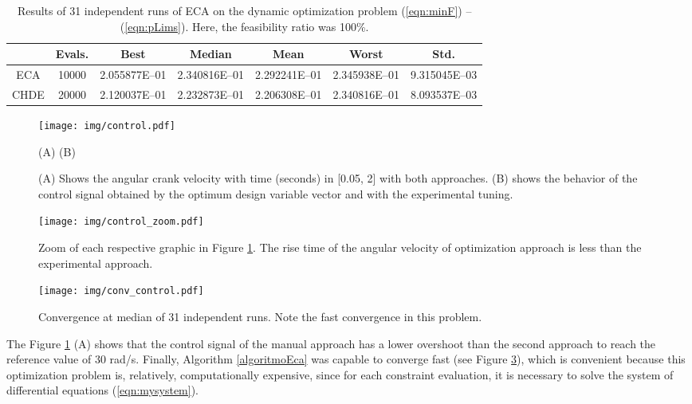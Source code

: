\documentclass[12pt,letterpape]{article}
\begin{document}
\begin{table}[!ht]
	\centering
	\begin{tabular}{ccccccc}
		\hline
		& {\bf Evals.} & {\bf Best} & {\bf Median} & {\bf Mean} & {\bf Worst} & {\bf Std.} \\ \hline
		ECA & 10000 & 2.055877E--01 & 2.340816E--01 & 2.292241E--01 & 2.345938E--01 & 9.315045E--03 \\ \hline
		CHDE & 20000 & 2.120037E--01 & 2.232873E--01 & 2.206308E--01 & 2.340816E--01 & 8.093537E--03 \\ \hline
	\end{tabular}
	\caption{Results of 31 independent runs of ECA on the dynamic optimization
	problem (\ref{eqn:minF}) -- (\ref{eqn:pLims}). Here, the feasibility ratio was 100\%.}
	\label{tab:res2}
\end{table}
% 
% 
% 
% 
\begin{figure}[!ht]
	\centering
	\texttt{[image: img/control.pdf]}
	\begin{center}
		(A) \hspace{0.4\linewidth} (B)
	\end{center}
	\caption{(A) Shows the angular crank velocity with time (seconds) in [0.05, 2]
	with both approaches. (B) shows the behavior of the control signal obtained
	by the optimum design variable vector and with the experimental tuning.}
	\label{fig:tunning}
\end{figure}
% 
% 
% 
\begin{figure}[!ht]
	\centering
	\texttt{[image: img/control\_zoom.pdf]}
	\caption{Zoom of each respective graphic in Figure \ref{fig:tunning}. The
	rise time of the angular velocity of optimization approach is less than the
	experimental approach.}
	\label{fig:tunningZoom}
\end{figure}
% 
% 
\begin{figure}[!ht]
	\centering
	\texttt{[image: img/conv\_control.pdf]}
	\caption{Convergence at median of 31 independent runs. Note the fast convergence
	in this problem.}
	\label{fig:convMedian2}
\end{figure}

The Figure \ref{fig:tunning} (A) shows that the control signal of the manual
approach has a lower overshoot than the second approach to reach the reference
value of 30 rad/s.
% 
Finally, Algorithm \ref{algoritmoEca} was capable to converge fast (see Figure \ref{fig:convMedian2}),
which is convenient because this optimization problem is, relatively,
computationally expensive, since for each constraint evaluation, it is necessary
to solve the system of differential equations (\ref{eqn:mysystem}).
\end{document}
